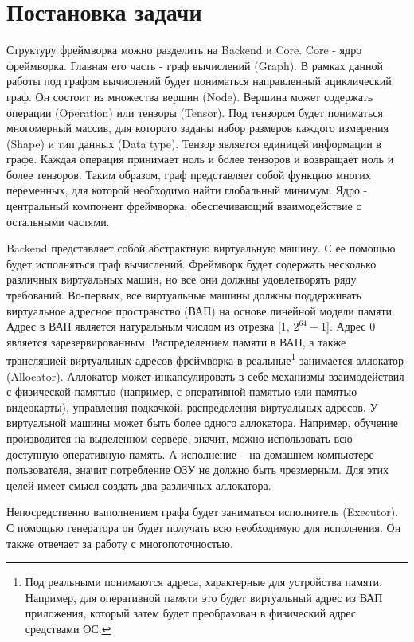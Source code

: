 \clearpage
\section{Постановка задачи}
Структуру фреймворка можно разделить на Backend и Core. Core - ядро фреймворка. Главная его часть - граф вычислений (Graph). В рамках данной работы под графом вычислений будет пониматься направленный ациклический граф. Он состоит из множества вершин (Node). Вершина может содержать операции (Operation) или тензоры (Tensor). Под тензором будет пониматься многомерный массив, для которого заданы набор размеров каждого измерения (Shape) и тип данных (Data type). Тензор является единицей информации в графе. Каждая операция принимает ноль и более тензоров и возвращает ноль и более тензоров. Таким образом, граф представляет собой функцию многих переменных, для которой необходимо найти глобальный минимум. Ядро - центральный компонент фреймворка, обеспечивающий взаимодействие с остальными частями. 
\par
Backend представляет собой абстрактную виртуальную машину. С ее помощью будет исполняться граф вычислений. Фреймворк будет содержать несколько различных виртуальных машин, но все они должны удовлетворять ряду требований. Во-первых, все виртуальные машины должны поддерживать виртуальное адресное пространство (ВАП) на основе линейной модели памяти. Адрес в ВАП является натуральным числом из отрезка [1, $2^{64}-1$]. Адрес 0 является зарезервированным. Распределением памяти в ВАП, а также трансляцией виртуальных адресов фреймворка в реальные\footnote{Под реальными понимаются адреса, характерные для устройства памяти. Например, для оперативной памяти это будет виртуальный адрес из ВАП приложения, который затем будет преобразован в физический адрес средствами ОС.} занимается аллокатор (Allocator). Аллокатор может инкапсулировать в себе механизмы взаимодействия с физической памятью (например, с оперативной памятью или памятью видеокарты), управления подкачкой, распределения виртуальных адресов. У виртуальной машины может быть более одного аллокатора. Например, обучение производится на выделенном сервере, значит, можно использовать всю доступную оперативную память. А исполнение -- на домашнем компьютере пользователя, значит потребление ОЗУ не должно быть чрезмерным. Для этих целей имеет смысл создать два различных аллокатора.
\par
Непосредственно выполнением графа будет заниматься исполнитель (Executor). С помощью генератора он будет получать всю необходимую для исполнения. Он также отвечает за работу с многопоточностью.
